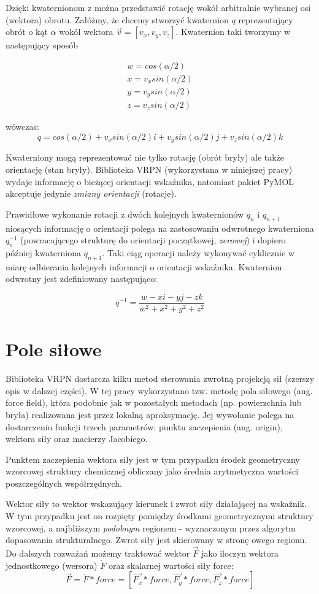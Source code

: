\documentclass[licencjacka]{pracamgr}
\begin{document}
Dzięki kwaternionom z można przedstawić rotację wokół arbitralnie wybranej osi (wektora) obrotu. Załóżmy, że chcemy stworzyć kwaternion $q$ reprezentujący obrót o kąt $\alpha$ wokół wektora $\vec{v}=[v_x,v_y,v_z]$. Kwaternion taki tworzymy w następujący sposób

$$
\begin{array}{lr}
w=cos(\alpha/2) \\
x=v_x sin(\alpha/2) \\
y=v_y sin(\alpha/2) \\
z=v_z sin(\alpha/2) 
\end{array}
$$

wówczas:
$$
q=cos(\alpha/2)+v_xsin(\alpha/2)i+v_ysin(\alpha/2)j+v_zsin(\alpha/2)k
$$

Kwaterniony mogą reprezentować nie tylko rotację (obrót bryły) ale także orientację (stan bryły). Biblioteka VRPN (wykorzystana w niniejszej pracy) wydaje informację o bieżącej orientacji wskaźnika, natomiast pakiet PyMOL akceptuje jedynie \textit{zmiany orientacji} (rotacje). 

Prawidłowe wykonanie rotacji z dwóch kolejnych kwaternionów $q_n$ i $q_{n+1}$ niosących informację o orientacji polega na zastosowaniu odwrotnego kwaterniona $q_n^{-1}$ (powracającego strukturę do orientacji początkowej, \textit{zerowej}) i dopiero później kwaterniona $q_{n+1}$. Taki ciąg operacji należy wykonywać cyklicznie w miarę odbierania kolejnych informacji o orientacji wskaźnika. Kwaternion odwrotny jest zdefiniowany następująco:

$$
q^{-1}=\frac{w-xi-yj-zk}{w^2+x^2+y^2+z^2}
$$


\section{Pole siłowe}
Biblioteka VRPN dostarcza kilku metod sterowania zwrotną projekcją sił (szerszy opis w dalszej części). W tej pracy wykorzystano tzw. metodę pola siłowego (ang. force field), która podobnie jak w pozostałych metodach (np. powierzchnia lub bryła) realizowana jest przez lokalną aproksymację. Jej wywołanie polega na dostarczeniu funkcji trzech parametrów: punktu zaczepienia (ang. origin), wektora siły oraz macierzy Jacobiego.

Punktem zaczepienia wektora siły jest w tym przypadku środek geometryczny wzorcowej struktury chemicznej obliczany jako średnia arytmetyczna wartości poszczególnych współrzędnych.

Wektor siły to wektor wskazujący kierunek i zwrot siły działającej na wskaźnik. W tym przypadku jest on rozpięty pomiędzy środkami geometrycznymi struktury wzorcowej, a najbliższym \textit{podobnym} regionem - wyznaczonym przez algorytm dopasowania strukturalnego. Zwrot siły jest skierowany w stronę owego regionu. Do dalszych rozważań możemy traktować wektor $\vec{F}$ jako iloczyn wektora jednostkowego (wersora) $\dot{F}$ oraz skalarnej wartości siły force:
$$
\vec{F}=\dot{F}*force=[\vec{F_x}*force,\vec{F_y}*force,\vec{F_z}*force]
$$
\end{document}

